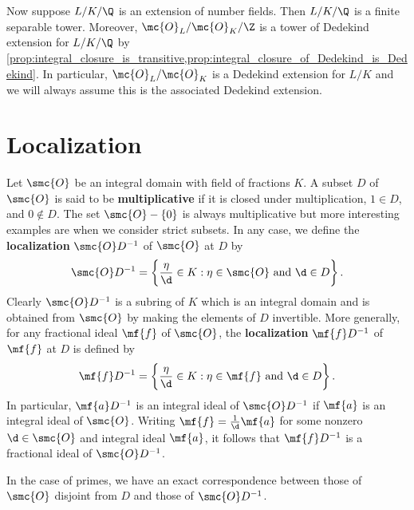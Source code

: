     Now suppose \(L/K/\Q\) is an extension of number fields. Then \(L/K/\Q\) is a finite separable tower. Moreover, \(\mc{O}_{L}/\mc{O}_{K}/\Z\) is a tower of Dedekind extension for \(L/K/\Q\) by \cref{prop:integral_closure_is_transitive,prop:integral_closure_of_Dedekind_is_Dedekind}. In particular, \(\mc{O}_{L}/\mc{O}_{K}\) is a Dedekind extension for \(L/K\) and we will always assume this is the associated Dedekind extension. 
  \section{Localization}
    Let \(\smc{O}\) be an integral domain with field of fractions \(K\). A subset \(D\) of \(\smc{O}\) is said to be \textbf{multiplicative} if it is closed under multiplication, \(1 \in D\), and \(0 \notin D\). The set \(\smc{O}-\{0\}\) is always multiplicative but more interesting examples are when we consider strict subsets. In any case, we define the \textbf{localization} \(\smc{O}D^{-1}\) of \(\smc{O}\) at \(D\) by
    \[
      \smc{O}D^{-1} = \left\{\frac{\eta}{\d} \in K:\eta \in \smc{O} \text{ and } \d \in D\right\}.
    \]
    Clearly \(\smc{O}D^{-1}\) is a subring of \(K\) which is an integral domain and is obtained from \(\smc{O}\) by making the elements of \(D\) invertible. More generally, for any fractional ideal \(\mf{f}\) of \(\smc{O}\), the \textbf{localization} \(\mf{f}D^{-1}\) of \(\mf{f}\) at \(D\) is defined by
    \[
      \mf{f}D^{-1} = \left\{\frac{\eta}{\d} \in K:\eta \in \mf{f} \text{ and } \d \in D\right\}.
    \]
    In particular, \(\mf{a}D^{-1}\) is an integral ideal of \(\smc{O}D^{-1}\) if \(\mf{a}\) is an integral ideal of \(\smc{O}\). Writing \(\mf{f} = \frac{1}{\d}\mf{a}\) for some nonzero \(\d \in \smc{O}\) and integral ideal \(\mf{a}\), it follows that \(\mf{f}D^{-1}\) is a fractional ideal of \(\smc{O}D^{-1}\).
    
    In the case of primes, we have an exact correspondence between those of \(\smc{O}\) disjoint from \(D\) and those of \(\smc{O}D^{-1}\).

